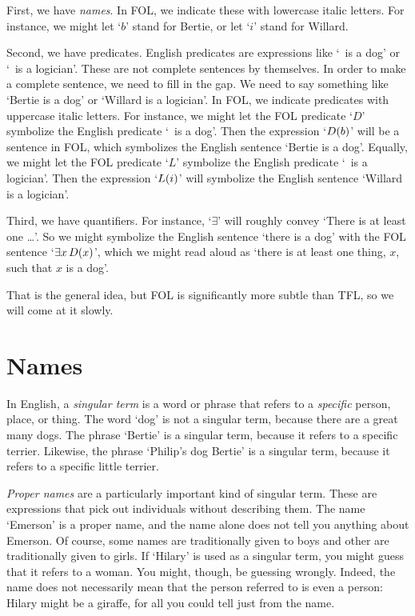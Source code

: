 First, we have \emph{names}. In FOL, we indicate these with lowercase italic letters. For instance, we might let `$b$' stand for Bertie, or let `$i$' stand for Willard.

Second, we have predicates. English predicates are expressions like `\blank\ is a dog' or `\blank\ is a logician'. These are not complete sentences by themselves. In order to make a complete sentence, we need to fill in the gap. We need to say something like `Bertie is a dog' or `Willard is a logician'. In FOL, we indicate predicates with uppercase italic letters. For instance, we might let the FOL predicate `$D$' symbolize the English predicate `\blank\ is a dog'. Then the expression `$\mathord{D}(b)$' will be a sentence in FOL, which symbolizes the English sentence `Bertie is a dog'. Equally, we might let the FOL predicate `$L$' symbolize the English predicate `\blank\ is a logician'. Then the expression `$\mathord{L}(i)$' will symbolize the English sentence `Willard is a logician'.

Third, we have quantifiers. For instance, `$\exists$' will roughly convey `There is at least one \ldots'. So we might symbolize the English sentence `there is a dog' with the FOL sentence `$\exists x\, \mathord{D}(x)$', which we might read aloud as `there is at least one thing, $x$, such that $x$ is a dog'.

That is the general idea, but FOL is significantly more subtle than TFL, so we will come at it slowly. 


\section{Names}
In English, a \emph{singular term} is a word or phrase that refers to a \emph{specific} person, place, or thing. The word `dog' is not a singular term, because there are a great many dogs. The phrase `Bertie' is a singular term, because it refers to a specific terrier. Likewise, the phrase `Philip's dog Bertie' is a singular term, because it refers to a specific little terrier. 

\emph{Proper names} are a particularly important kind of singular term. These are expressions that pick out individuals without describing them. The name `Emerson' is a proper name, and the name alone does not tell you anything about Emerson. Of course, some names are traditionally given to boys and other are traditionally given to girls. If `Hilary' is used as a singular term, you might guess that it refers to a woman. You might, though, be guessing wrongly. Indeed, the name does not necessarily mean that the person referred to is even a person: Hilary might be a giraffe, for all you could tell just from the name. 

